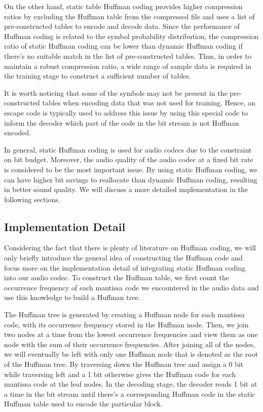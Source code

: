 \documentclass{vldb}
\begin{document}
On the other hand, static table Huffman coding provides higher compression ratios by excluding the Huffman table from the compressed file and uses a list of pre-constructed tables to encode and decode data. Since the performance of Huffman coding is related to the symbol probability distribution, the compression ratio of static Huffman coding can be lower than dynamic Huffman coding if there's no suitable match in the list of pre-constructed tables. Thus, in order to maintain a robust compression ratio, a wide range of sample data is required in the training stage to construct a sufficient number of tables.

It is worth noticing that some of the symbols may not be present in the pre-constructed tables when encoding data that was not used for training. Hence, an escape code is typically used to address this issue by using this special code to inform the decoder which part of the code in the bit stream is not Huffman encoded. 

In general, static Huffman coding is used for audio codecs due to the constraint on bit budget. Moreover, the audio quality of the audio codec at a fixed bit rate is considered to be the most important issue. By using static Huffman coding, we can have higher bit savings to reallocate than  dynamic Huffman coding, resulting in better sound quality. We will discuss a more detailed implementation in the following sections.

\subsection{Implementation Detail}
Considering the fact that there is plenty of literature on Huffman coding, we will only briefly introduce the general idea of constructing the Huffman code and focus more on the implementation detail of integrating static Huffman coding into our audio codec. To construct the Huffman table, we first count the occurrence frequency of each mantissa code we encountered in the audio data and use this knowledge to build a Huffman tree.

The Huffman tree is generated by creating a Huffman node for each mantissa code, with its occurrence frequency stored in the Huffman node. Then, we join two nodes at a time from the lowest occurrence frequencies and view them as one node with the sum of their occurrence frequencies. After joining all of the nodes, we will eventually be left with only one Huffman node that is denoted as the root of the Huffman tree. By traversing down the Huffman tree and assign a 0 bit while traversing left and a 1 bit otherwise gives the Huffman code for each mantissa code at the leaf nodes. In the decoding stage, the decoder reads 1 bit at a time in the bit stream until there's a corresponding Huffman code in the static Huffman table used to encode the particular block.
\end{document}
